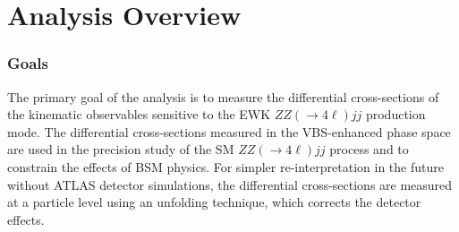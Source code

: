 \part {\LARGE{Analysis Overview}}
\label{sec:AnalysisOverview}

\section{Goals}
\label{sec:Analysis_Goals}

The primary goal of the analysis is to measure the differential cross-sections of the kinematic observables sensitive to the EWK $ZZ ( \rightarrow 4\ell) jj$ production mode. The differential cross-sections measured in the VBS-enhanced phase space are used in the precision study of the SM $ZZ ( \rightarrow 4\ell) jj$ process and to constrain the effects of BSM physics. For simpler re-interpretation in the future without ATLAS detector simulations, the differential cross-sections are measured at a particle level using an unfolding technique, which corrects the detector effects.